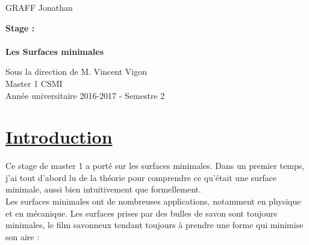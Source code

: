 \documentclass {report}
\begin{document}
\baselineskip=0.5cm
\huge{GRAFF Jonathan}
\vspace{5cm}
\begin{center}
\Huge{\bf Stage : \\ \  \\Les Surfaces minimales}
\end{center}
\vspace{6cm}
\hspace{2cm} \huge{Sous la direction de M. Vincent Vigon}
\vspace{2cm}\\
\hspace*{10.5cm}\Large{Master 1 CSMI \vspace{1cm}\\ \hspace*{5cm}Année universitaire 2016-2017 - Semestre 2}\normalsize
\tableofcontents
\newpage

\chapter[Introduction]{\uline{Introduction}}

Ce stage de master 1 a porté sur les surfaces minimales. Dans un premier temps, j'ai tout d'abord lu de la théorie pour comprendre ce qu'était une surface minimale, aussi bien intuitivement que formellement. \\

Les surfaces minimales ont de nombreuses applications, notamment en physique et en mécanique. Les surfaces prises par des bulles de savon sont toujours minimales, le film savonneux tendant toujours à prendre une forme qui minimise son aire : 
\end{document}
